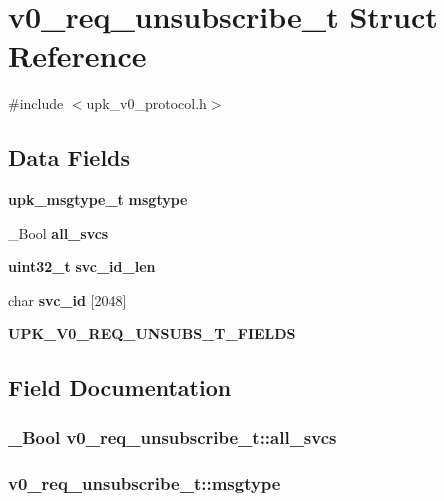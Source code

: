 \section{v0\_\-req\_\-unsubscribe\_\-t Struct Reference}
\label{structv0__req__unsubscribe__t}


{\ttfamily \#include $<$upk\_\-v0\_\-protocol.h$>$}

\subsection*{Data Fields}
\begin{DoxyCompactItemize}
\item 
{\bf upk\_\-msgtype\_\-t} {\bf msgtype}
\item 
\_\-Bool {\bf all\_\-svcs}
\item 
{\bf uint32\_\-t} {\bf svc\_\-id\_\-len}
\item 
char {\bf svc\_\-id} [2048]
\item 
{\bf UPK\_\-V0\_\-REQ\_\-UNSUBS\_\-T\_\-FIELDS}
\end{DoxyCompactItemize}


\subsection{Field Documentation}
\subsubsection[{all\_\-svcs}]{\setlength{\rightskip}{0pt plus 5cm}\_\-Bool {\bf v0\_\-req\_\-unsubscribe\_\-t::all\_\-svcs}}\label{structv0__req__unsubscribe__t_acd2b23957ff68e705e74527f4c0a6069}
\subsubsection[{msgtype}]{ {\bf v0\_\-req\_\-unsubscribe\_\-t::msgtype}}\label{structv0__req__unsubscribe__t_a8af9275c1eff2190717d0dc8a7e84d36}
